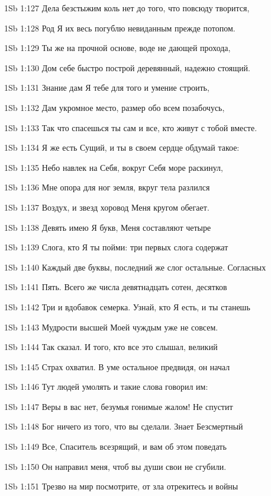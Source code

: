 \vs 1Sb 1:127 Дела безстыжим коль нет до того, что повсюду творится,

\vs 1Sb 1:128 Род Я их весь погублю невиданным прежде потопом.

\vs 1Sb 1:129 Ты же на прочной основе, воде не дающей прохода,

\vs 1Sb 1:130 Дом себе быстро построй деревянный, надежно стоящий.

\vs 1Sb 1:131 Знание дам Я тебе для того и умение строить,

\vs 1Sb 1:132 Дам укромное место, размер  обо всем позабочусь,

\vs 1Sb 1:133 Так что спасешься ты сам и все, кто живут с тобой вместе.

\vs 1Sb 1:134 Я же есть Сущий, и ты в своем сердце обдумай такое:

\vs 1Sb 1:135 Небо навлек на Себя, вокруг Себя море раскинул,

\vs 1Sb 1:136 Мне опора для ног  земля, вкруг тела разлился

\vs 1Sb 1:137 Воздух, и звезд хоровод Меня кругом обегает.

\vs 1Sb 1:138 Девять имею Я букв, Меня составляют четыре

\vs 1Sb 1:139 Слога, кто Я  ты пойми: три первых слога содержат

\vs 1Sb 1:140 Каждый две буквы, последний же слог  остальные. Согласных

\vs 1Sb 1:141 Пять. Всего же числа  девятнадцать сотен, десятков

\vs 1Sb 1:142 Три и вдобавок семерка. Узнай, кто Я есть, и ты станешь

\vs 1Sb 1:143 Мудрости высшей Моей чуждым уже не совсем.

\vs 1Sb 1:144 Так сказал. И того, кто все это слышал, великий

\vs 1Sb 1:145 Страх охватил. В уме остальное предвидя, он начал

\vs 1Sb 1:146 Тут людей умолять и такие слова говорил им:

\vs 1Sb 1:147 Веры в вас нет, безумья гонимые жалом! Не спустит

\vs 1Sb 1:148 Бог ничего из того, что вы сделали. Знает Безсмертный

\vs 1Sb 1:149 Все, Спаситель всезрящий, и вам об этом поведать

\vs 1Sb 1:150 Он направил меня, чтоб вы души свои не сгубили.

\vs 1Sb 1:151 Трезво на мир посмотрите, от зла отрекитесь и войны

